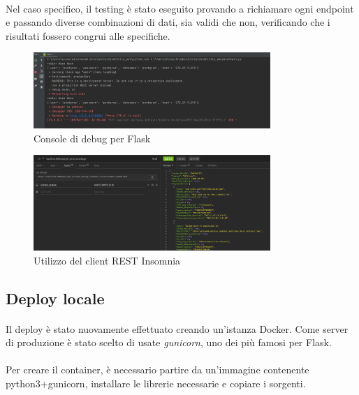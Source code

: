 \documentclass[11pt,a4paper,english]{article}
\begin{document}
\paragraph{} Nel caso specifico, il testing è stato eseguito provando a richiamare ogni endpoint e passando diverse combinazioni di dati, sia validi che non, verificando che i risultati fossero congrui alle specifiche.


\begin{figure}[H]
    \centering
    \includegraphics[width=0.8\textwidth]{img/api_debug.png}
    \caption{Console di debug per Flask}
\end{figure}


\begin{figure}[H]
    \centering
    \includegraphics[width=0.8\textwidth]{img/insomnia.png}
    \caption{Utilizzo del client REST Insomnia}
\end{figure}



\subsection{Deploy locale}

\paragraph{} Il deploy è stato nuovamente effettuato creando un'istanza Docker. Come server di produzione è stato scelto di usate \emph{gunicorn}, uno dei più famosi per Flask.

\paragraph{} Per creare il container, è necessario partire da un'immagine contenente python3+gunicorn, installare le librerie necessarie e copiare i sorgenti.
\end{document}
